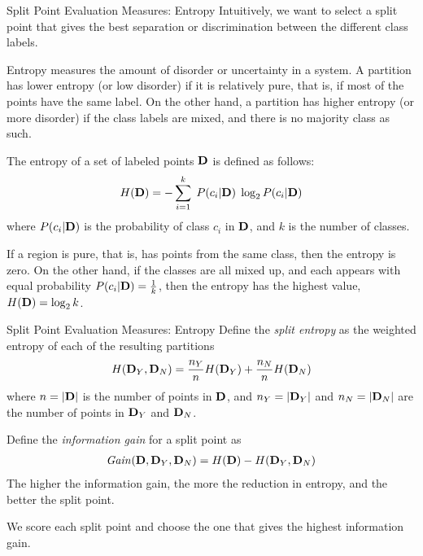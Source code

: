 \begin{frame}{Split Point Evaluation Measures: Entropy}
Intuitively, we want to
select a split point that gives the best separation or
discrimination between the different class labels.

\medskip
Entropy measures the amount of disorder or
uncertainty in a system.
A partition has lower entropy (or low
 disorder) if it is relatively pure, that is, if most of the points have the same label. On the other hand, a partition
has higher entropy (or more
disorder) if the class labels are mixed, and there is no majority class
as such.

\medskip
The entropy of a set of labeled points $\mathbf{D}$ is def\/{i}ned as
follows:
\begin{align*}
  H(\mathbf{D}) = -\sum_{i=1}^k \;P(c_i|\mathbf{D}) \;\log_2 P(c_i|\mathbf{D})
\end{align*}
where $P(c_i|\mathbf{D})$ is the probability of class $c_i$ in $\mathbf{D}$, and
$k$ is the number of classes. 

\medskip
If a region is pure, that is, has
points from the same class, then the entropy is zero. On the other
hand, if the classes are all mixed up, and each appears with equal
probability $P(c_i|\mathbf{D})=\tfrac{1}{k}$, then the entropy has the
highest value, $H(\mathbf{D}) = \log_2 k$.
\end{frame}




\begin{frame}{Split Point Evaluation Measures: Entropy}
Def\/{i}ne the {\em split entropy} as the
weighted entropy of each of the resulting partitions
\begin{align*}
  H(\mathbf{D}_Y,\mathbf{D}_N) =
  \frac{n_Y}{n}H(\mathbf{D}_Y)+\frac{n_N}{n}H(\mathbf{D}_N)
\end{align*}
where $n = |\mathbf{D}|$ is the number of points in $\mathbf{D}$, and $n_Y = |\mathbf{D}_Y|$
and $n_N = |\mathbf{D}_N|$ are the number of points in $\mathbf{D}_Y$ and
$\mathbf{D}_N$.

\medskip
Def\/{i}ne the {\em information gain}
for a split point as
\begin{align*}
  \mathit{Gain}(\mathbf{D},\mathbf{D}_Y,\mathbf{D}_N) = H(\mathbf{D}) - H(\mathbf{D}_Y,\mathbf{D}_N)
\end{align*}
The higher the information gain, the more the reduction in
entropy, and the better the split point.  

\medskip
We score each split point
and choose the one that gives the highest information gain.
\end{frame}


